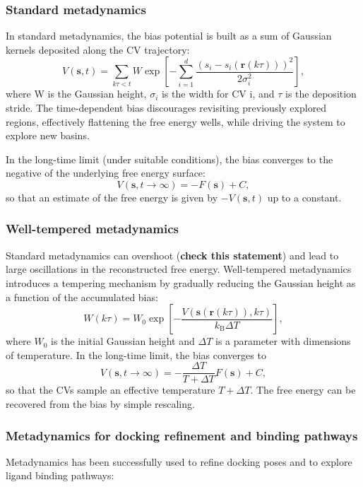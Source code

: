 \documentclass[12pt]{article}
\begin{document}
\subsubsection{Standard metadynamics}

In standard metadynamics, the bias potential is built as a sum of Gaussian kernels deposited along the CV trajectory:
\[
V(\mathbf{s}, t) = \sum_{k\tau < t} W \exp\left[-\sum_{i=1}^{d} \frac{\left(s_i - s_i(\mathbf{r}(k\tau))\right)^2}{2\sigma_i^2}\right],
\]
where W is the Gaussian height, $\sigma_i$ is the width for CV i, and $\tau$ is the deposition stride.\cite{CH9_LaioParrinello2002} The time-dependent bias discourages revisiting previously explored regions, effectively flattening the free energy wells, while driving the system to explore new basins.

In the long-time limit (under suitable conditions), the bias converges to the negative of the underlying free energy surface:
\[
V(\mathbf{s},t\to\infty) = -F(\mathbf{s}) + C,
\]
so that an estimate of the free energy is given by $-V(\mathbf{s},t)$ up to a constant.

\subsubsection{Well-tempered metadynamics}

Standard metadynamics can overshoot (\textbf{check this statement}) and lead to large oscillations in the reconstructed free energy. Well-tempered metadynamics introduces a tempering mechanism by gradually reducing the Gaussian height as a function of the accumulated bias:\cite{CH9_Barducci2008}
\[
W(k\tau) = W_0 \exp\left[-\frac{V(\mathbf{s}(\mathbf{r}(k\tau)),k\tau)}{k_{\mathrm{B}}\Delta T}\right],
\]
where $W_0$ is the initial Gaussian height and $\Delta T$ is a parameter with dimensions of temperature. In the long-time limit, the bias converges to
\[
V(\mathbf{s}, t\to\infty) = -\frac{\Delta T}{T + \Delta T} F(\mathbf{s}) + C,
\]
so that the CVs sample an effective temperature $T + \Delta T$. The free energy can be recovered from the bias by simple rescaling.

\subsubsection{Metadynamics for docking refinement and binding pathways}

Metadynamics has been successfully used to refine docking poses and to explore ligand binding pathways:
\end{document}

